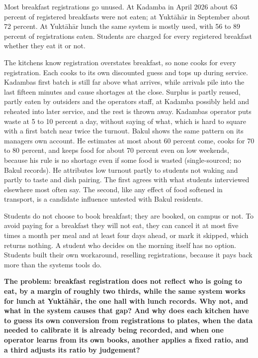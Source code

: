 \documentclass[
  10pt,
  table]{article}
\newcounter{none} %
\begin{document}
Most breakfast registrations go unused. At Kadamba in April 2026 about 63 percent of registered breakfasts were not eaten; at Yuktāhār in September about 72 percent. At Yuktāhār lunch the same system is mostly used, with 56 to 89 percent of registrations eaten. Students are charged for every registered breakfast whether they eat it or not.

The kitchens know registration overstates breakfast, so none cooks for every registration. Each cooks to its own discounted guess and tops up during service. Kadamba\textquotesingle s first batch is still far above what arrives, while arrivals pile into the last fifteen minutes and cause shortages at the close. Surplus is partly reused, partly eaten by outsiders and the operators\textquotesingle{} staff, at Kadamba possibly held and reheated into later service, and the rest is thrown away. Kadamba\textquotesingle s operator puts waste at 5 to 10 percent a day, without saying of what, which is hard to square with a first batch near twice the turnout. Bakul shows the same pattern on its manager\textquotesingle s own account. He estimates at most about 60 percent come, cooks for 70 to 80 percent, and keeps food for about 70 percent even on low weekends, because his rule is no shortage even if some food is wasted (single-sourced; no Bakul records). He attributes low turnout partly to students not waking and partly to taste and dish pairing. The first agrees with what students interviewed elsewhere most often say. The second, like any effect of food softened in transport, is a candidate influence untested with Bakul residents.

Students do not choose to book breakfast; they are booked, on campus or not. To avoid paying for a breakfast they will not eat, they can cancel it at most five times a month per meal and at least four days ahead, or mark it skipped, which returns nothing. A student who decides on the morning itself has no option. Students built their own workaround, reselling registrations, because it pays back more than the system\textquotesingle s tools do.

\textbf{The problem: breakfast registration does not reflect who is going to eat, by a margin of roughly two thirds, while the same system works for lunch at Yuktāhār, the one hall with lunch records. Why not, and what in the system causes that gap? And why does each kitchen have to guess its own conversion from registrations to plates, when the data needed to calibrate it is already being recorded, and when one operator learns from its own books, another applies a fixed ratio, and a third adjusts its ratio by judgement?}
\end{document}
